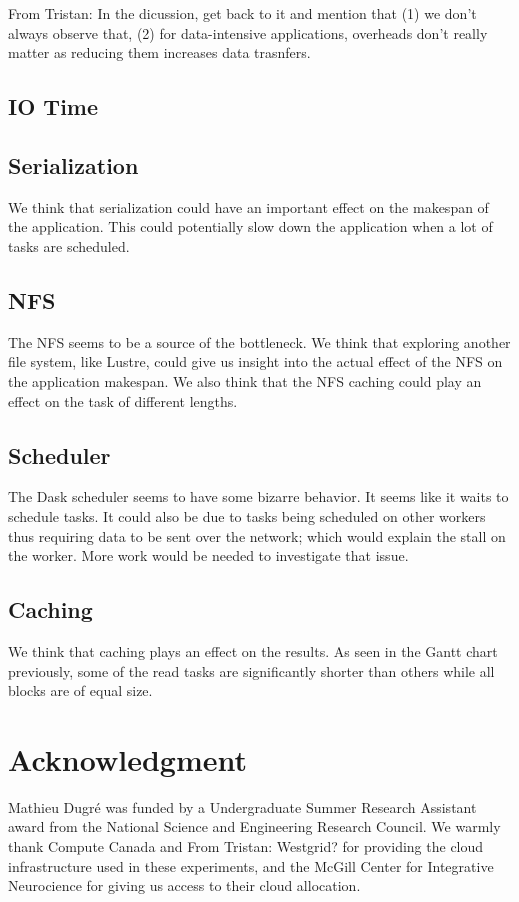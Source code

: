 \documentclass[conference]{IEEEtran}
\newcommand{\TG}[1]{\color{cyan}From Tristan: #1 \color{black}}
\begin{document}
\TG{In the dicussion, get back to it and mention that (1) we don't
always observe that, (2) for data-intensive applications, overheads don't really matter
as reducing them increases data trasnfers.}

\subsection{IO Time}


\subsection{Serialization}
We think that serialization could have an important effect on the makespan of the
application. This could potentially slow down the application when a lot of tasks are
scheduled.

\subsection{NFS}
The NFS seems to be a source of the bottleneck. We think that exploring another file
system, like Lustre, could give us insight into the actual effect of the NFS on the
application makespan. We also think that the NFS caching could play an effect on the
task of different lengths.

\subsection{Scheduler}
The Dask scheduler seems to have some bizarre behavior. It seems like it waits to
schedule tasks. It could also be due to tasks being scheduled on other workers
thus requiring data to be sent over the network; which would explain the stall on the
worker. More work would be needed to investigate that issue.


\subsection{Caching}
We think that caching plays an effect on the results. As seen in the Gantt chart
previously, some of the read tasks are significantly shorter than others while all
blocks are of equal size.

\section*{Acknowledgment}

Mathieu Dugr\'e was funded by a Undergraduate Summer Research Assistant
award from the National Science and Engineering Research Council. We warmly
thank Compute Canada and \TG{Westgrid?} for providing the cloud
infrastructure used in these experiments, and the McGill Center for
Integrative Neurocience for giving us access to their cloud allocation.



\end{document}
